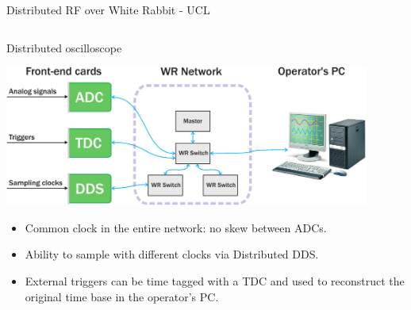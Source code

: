 \documentclass[compress,red]{beamer}
\begin{document}
\begin{frame}{Distributed RF over White Rabbit - UCL}
\begin{columns}[c]
\begin{center}
      \end{center}
  \end{columns}
\end{frame}


\begin{frame}{Distributed oscilloscope}
  \begin{center}
    \includegraphics[width=0.9\textwidth]{../../figures/applications/distr_oscill.pdf}
    \end{center}
    \begin{block}{}
      \begin{itemize}
      \item Common clock in the entire network: no skew between ADCs.
      \item Ability to sample with different clocks via Distributed DDS.
      \item External triggers can be time tagged with a TDC and used to reconstruct the original time base in the operator's PC.
      \end{itemize}
    \end{block}
\end{frame}
\end{document}
